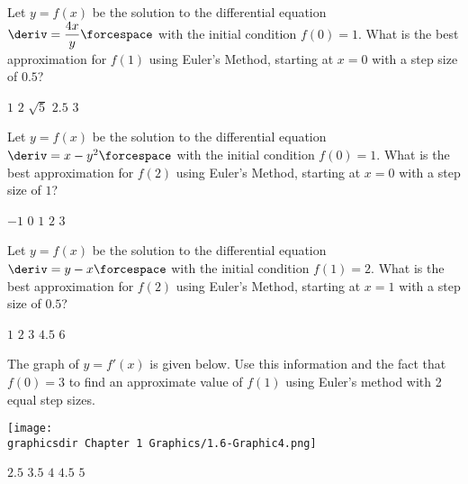 \begin{questions}
    \question Let $y = f(x)$ be the solution to the differential equation $\deriv = \dfrac{4x}{y} \forcespace$ with the initial condition $f(0) = 1$. What is the best approximation for $f(1)$ using Euler's Method, starting at $x = 0$ with a step size of $0.5$? \\

    \begin{oneparchoices}
        \choice $1$
        \choice $2$
        \choice $\sqrt{5}$
        \choice $2.5$
        \choice $3$
    \end{oneparchoices} \par \horizontalline

    \question Let $y = f(x)$ be the solution to the differential equation $\deriv = x - y^2 \forcespace$ with the initial condition $f(0) = 1$. What is the best approximation for $f(2)$ using Euler's Method, starting at $x = 0$ with a step size of $1$? \\

    \begin{oneparchoices}
        \choice $-1$
        \choice $0$
        \choice $1$
        \choice $2$
        \choice $3$
    \end{oneparchoices} \par \horizontalline

    \question Let $y = f(x)$ be the solution to the differential equation $\deriv = y - x \forcespace$ with the initial condition $f(1) = 2$. What is the best approximation for $f(2)$ using Euler's Method, starting at $x = 1$ with a step size of $0.5$? \\

    \begin{oneparchoices}
        \choice $1$
        \choice $2$
        \choice $3$
        \choice $4.5$
        \choice $6$
    \end{oneparchoices} \par \horizontalline

    \question The graph of $y = f'(x)$ is given below. Use this information and the fact that $f(0) = 3$ to find an approximate value of $f(1)$ using Euler's method with 2 equal step sizes. \\

    \begin{center}
        \texttt{[image: \\graphicsdir Chapter 1 Graphics/1.6-Graphic4.png]}
    \end{center} 

    \begin{oneparchoices}
        \choice $2.5$
        \choice $3.5$
        \choice $4$
        \choice $4.5$
        \choice $5$
    \end{oneparchoices} \par \horizontalline


\end{questions}
